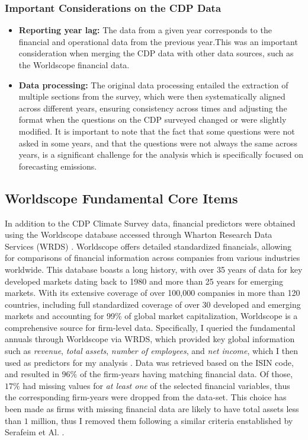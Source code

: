 \subsubsection{Important Considerations on the CDP Data}
\begin{itemize}
    \item \textbf{Reporting year lag:} The data from a given year corresponds to the financial and operational data from the previous year.This was an important consideration when merging the CDP data with other data sources, such as the Worldscope financial data.
    \item \textbf{Data processing:} The original data processing entailed the extraction of multiple sections from the survey, which were then systematically aligned across different years, ensuring consistency across times and adjusting the format when the questions on the CDP surveyed changed or were slightly modified. It is important to note that the fact that some questions were not asked in some years, and that the questions were not always the same across years, is a significant challenge for the analysis which is specifically focused on forecasting emissions.

\end{itemize}


\subsection{Worldscope Fundamental Core Items}
In addition to the CDP Climate Survey data, financial predictors were obtained using the Worldscope database \cite{Worldscope_2} accessed through Wharton Research Data Services (WRDS) \cite{WRDS}. Worldscope offers detailed standardized financials, allowing for comparisons of financial information across companies from various industries worldwide. This database boasts a long history, with over 35 years of data for key developed markets dating back to 1980 and more than 25 years for emerging markets. With its extensive coverage of over 100,000 companies in more than 120 countries, including full standardized coverage of over 30 developed and emerging markets and accounting for 99\% of global market capitalization, Worldscope is a comprehensive source for firm-level data. Specifically, I queried the fundamental annuals through Worldscope via WRDS, which provided key global information such as \textit{revenue}, \textit{total assets}, \textit{number of employees}, and \textit{net income}, which I then used as predictors for my analysis \cite{Worldscope_2}. Data was retrieved based on the ISIN code, and resulted in $96\%$ of the firm-years having matching financial data. Of those, $17\%$ had missing values for \textit{at least one} of the selected financial variables, thus the corresponding firm-years were dropped from the data-set. This choice has been made as firms with missing financial data are likely to have total assets less than $1$ million, thus I removed them following a similar criteria enstablished by Serafeim et Al. \cite{incentive-diffusion}.

